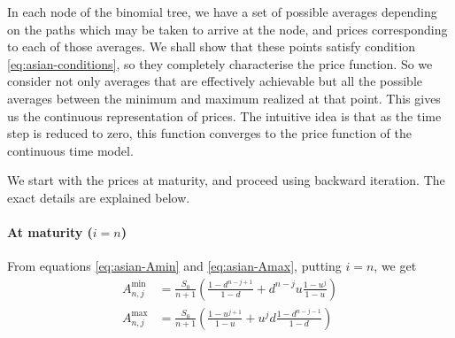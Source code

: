 In each node of the binomial tree, we have a set of possible averages depending on the paths which may be taken to arrive at the node, and prices corresponding to each of those averages. We shall show that these points satisfy condition \ref{eq:asian-conditions}, so they completely characterise the price function. So we consider not only averages that are effectively achievable but all the possible averages between the minimum and maximum realized at that point. This gives us the continuous representation of prices. The intuitive idea is that as the time step is reduced to zero, this function converges to the price function of the continuous time model.

We start with the prices at maturity, and proceed using backward iteration. The exact details are explained below.


\paragraph{At maturity ($ i = n $)}

From equations \ref{eq:asian-Amin} and \ref{eq:asian-Amax}, putting $i = n$, we get
\begin{align*}
	A_{n,j}^{\min} &= \frac{S_0}{n+1} \left( \frac{1 - d^{n-j+1}}{1-d} + d^{n-j} u \frac{1 - u^{j}}{1-u} \right) \\
	A_{n,j}^{\max} &= \frac{S_0}{n+1} \left( \frac{1 - u^{j+1}}{1-u} + u^{j} d \frac{1 - d^{n-j-1}}{1-d} \right)
\end{align*}

